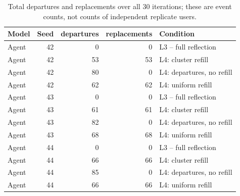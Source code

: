 \begin{table}[htbp!]
\centering
\small
\setlength{\tabcolsep}{3pt}
\renewcommand{\arraystretch}{1.1}
\begin{tabular}{lrrrl}
\hline
Model & Seed & departures & replacements & Condition \\
\hline
Agent & 42 & 0 & 0 & L3 -- full reflection \\
Agent & 42 & 53 & 53 & L4: cluster refill \\
Agent & 42 & 80 & 0 & L4: departures, no refill \\
Agent & 42 & 62 & 62 & L4: uniform refill \\
Agent & 43 & 0 & 0 & L3 -- full reflection \\
Agent & 43 & 61 & 61 & L4: cluster refill \\
Agent & 43 & 82 & 0 & L4: departures, no refill \\
Agent & 43 & 68 & 68 & L4: uniform refill \\
Agent & 44 & 0 & 0 & L3 -- full reflection \\
Agent & 44 & 66 & 66 & L4: cluster refill \\
Agent & 44 & 85 & 0 & L4: departures, no refill \\
Agent & 44 & 66 & 66 & L4: uniform refill \\
\hline
\end{tabular}
\caption{Total departures and replacements over all 30 iterations; these are event counts, not counts of independent replicate users.}
\label{chap:results:tab:rq1_sampling_turnover_totals}
\end{table}
